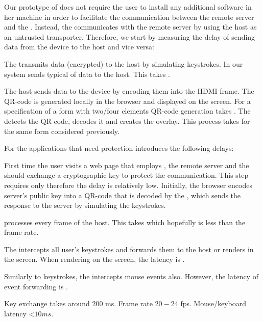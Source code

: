 Our prototype of \name does not require the user to install any additional software in her machine in order to facilitate the communication between the remote server and the \device. Instead, the \device communicates with the remote server by using the host as an untrusted transporter. Therefore, we start by measuring the delay of sending data from the device to the host and vice versa:

 The \device transmits data (encrypted) to the host by simulating keystrokes. In our system \device sends typical  of data to the host. This takes .

 The host sends data to the device by encoding them into the HDMI frame. The QR-code is generated locally in the browser and displayed on the screen. For a specification of a form with two/four elements QR-code generation takes . The \device detects the QR-code, decodes it and creates the overlay. This process takes  for the same form considered previously.
 
For the applications that need protection \name introduces the following delays:

 First time the user visits a web page that employs \name, the remote server and the \device should exchange a cryptographic key to protect the communication. This step requires only  therefore the delay is relatively low. Initially, the browser encodes server's public key into a QR-code that is decoded by the \device, which sends the response to the server by simulating the keystrokes.

 \device processes every frame of the host. This takes  which hopefully is less than the frame rate.

 The \device intercepts all user's keystrokes and forwards them to the host or renders in the screen. When rendering on the screen, the latency is .

 Similarly to keystrokes, the \device intercepts mouse events also. However, the latency of event forwarding is .


Key exchange takes around $200$ ms. Frame rate $20-24$ fps. Mouse/keyboard latency \textless$10ms$.